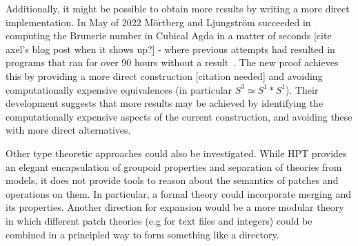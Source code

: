Additionally, it might be possible to obtain more results by writing a more
direct implementation. In May of 2022 M\"ortberg and Ljungstr\"om succeeded in
computing the Brunerie number in Cubical Agda in a matter of seconds [cite
axel's blog post when it shows up?] - where previous attempts had resulted in
programs that ran for over 90 hours without a result~\cite{mortberg2018}. The
new proof achieves this by providing a more direct construction [citation
needed] and avoiding computationally expensive equivalences (in particular $S^3
\simeq S^1 \ast S^1$). Their development suggests that more results may be
achieved by identifying the computationally expensive aspects of the current
construction, and avoiding these with more direct alternatives.

Other type theoretic approaches could also be investigated. While HPT provides
an elegant encapsulation of groupoid properties and separation of theories from
models, it does not provide tools to reason about the semantics of patches and
operations on them. In particular, a formal theory could incorporate merging and
its properties. Another direction for expansion would be a more modular theory
in which different patch theories (e.g for text files and integers) could be
combined in a principled way to form something like a directory.
